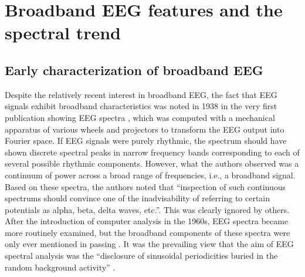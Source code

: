\section{Broadband EEG features and the spectral trend} \label{sec:phenomenon}
\subsection{Early characterization of broadband EEG}
Despite the relatively recent interest in broadband EEG, the fact that EEG signals exhibit broadband characteristics was noted in 1938 in the very first publication showing EEG spectra \cite{Grass1938}, which was computed with a mechanical apparatus of various wheels and projectors to transform the EEG output into Fourier space. If EEG signals were purely rhythmic, the spectrum should have shown discrete spectral peaks in narrow frequency bands corresponding to each of several possible rhythmic components. However, what the authors observed was a continuum of power across a broad range of frequencies, i.e., a broadband signal. Based on these spectra, the authors noted that ``inspection of such continuous spectrums should convince one of the inadvisability of referring to certain potentials as alpha, beta, delta waves, etc.''\cite{Grass1938}. This was clearly ignored by others. After the introduction of computer analysis in the 1960s, EEG spectra became more routinely examined, but the broadband components of these spectra were only ever mentioned in passing \cite{Boudreau1963}. It was the prevailing view that the aim of EEG spectral analysis was the ``disclosure of sinusoidal periodicities buried in the random background activity'' \cite{Freeman1975}. 


